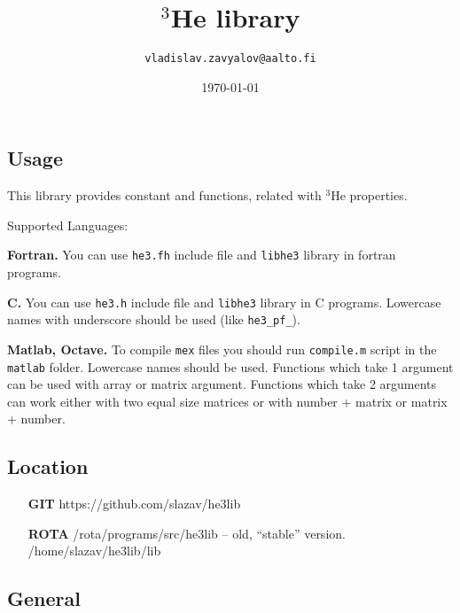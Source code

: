 \documentclass[a4paper]{article}
\begin{document}
\title{$^3$He library}
\date{\today}
\author{\tt vladislav.zavyalov@aalto.fi}
\maketitle

\subsection*{Usage}

This library provides constant and functions, related with $^3$He properties.

\noindent Supported Languages:

{\bf Fortran.}
You can use {\tt he3.fh} include file and {\tt libhe3} library in
fortran programs.

{\bf C.}
You can use {\tt he3.h} include file and {\tt libhe3} library in C programs.
Lowercase names with underscore should be used (like {\tt he3\_pf\_}).

{\bf Matlab, Octave.}
To compile {\tt mex} files you should run {\tt compile.m} script in the {\tt matlab}
folder. Lowercase names should be used.
Functions which take 1 argument can be used with array or matrix argument.
Functions which take 2 arguments can work either with two equal size matrices
or with number + matrix or matrix + number.

\subsection*{Location}
\begin{itemize}
\item[\bf GIT]  https://github.com/slazav/he3lib
\item[\bf ROTA] /rota/programs/src/he3lib -- old, ``stable'' version.\\
/home/slazav/he3lib/lib
\end{itemize}

\subsection*{General}
\end{document}
